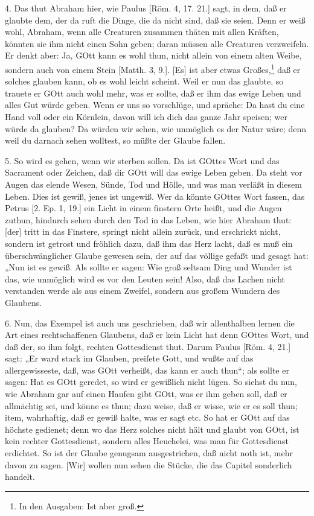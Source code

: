 4. Das thut Abraham hier, wie Paulus [Röm. 4, 17. 21.] sagt, in dem, daß er glaubte dem, der da ruft die Dinge, die da nicht sind, daß sie seien. Denn er weiß wohl, Abraham, wenn alle Creaturen zusammen thäten mit allen Kräften, könnten sie ihm nicht einen Sohn geben; daran müssen alle Creaturen verzweifeln. Er denkt aber: Ja, GOtt kann es wohl thun, nicht allein von einem alten Weibe, sondern auch von einem Stein [Matth. 3, 9.]. [Es] ist aber etwas Großes,\footnote{In den Ausgaben: Ist aber groß.} daß er solches glauben kann, ob es wohl leicht scheint. Weil er nun das glaubte, so trauete er GOtt auch wohl mehr, was er sollte, daß er ihm das ewige Leben und alles Gut würde geben. Wenn er uns so vorschlüge, und spräche: Da hast du eine Hand voll oder ein Körnlein, davon will ich dich das ganze Jahr speisen; wer würde da glauben? Da würden wir sehen, wie unmöglich es der Natur wäre; denn weil du darnach sehen wolltest, so müßte der Glaube fallen.

5. So wird es gehen, wenn wir sterben sollen. Da ist GOttes Wort und das Sacrament oder Zeichen, daß dir GOtt will das ewige Leben geben. Da steht vor Augen das elende Wesen, Sünde, Tod und Hölle, und was man verläßt in diesem Leben. Dies ist gewiß, jenes ist ungewiß. Wer da könnte GOttes Wort fassen, das Petrus [2. Ep. 1, 19.] ein Licht in einem finstern Orte heißt, und die Augen zuthun, hindurch sehen durch den Tod in das Leben, wie hier Abraham thut: [der] tritt in das Finstere, springt nicht allein zurück, und erschrickt nicht, sondern ist getrost und fröhlich dazu, daß ihm das Herz lacht, daß es muß ein überschwänglicher Glaube gewesen sein, der auf das völlige gefaßt und gesagt hat: „Nun ist es gewiß. Als sollte er sagen: Wie groß seltsam Ding und Wunder ist das, wie unmöglich wird es vor den Leuten sein! Also, daß das Lachen nicht verstanden werde als aus einem Zweifel, sondern aus großem Wundern des Glaubens.

6. Nun, das Exempel ist auch uns geschrieben, daß wir allenthalben lernen die Art eines rechtschaffenen Glaubens, daß er kein Licht hat denn GOttes Wort, und daß der, so ihm folgt, rechten Gottesdienst thut. Darum Paulus [Röm. 4, 21.] sagt: „Er ward stark im Glauben, preiſete Gott, und wußte auf das allergewisseste, daß, was GOtt verheißt, das kann er auch thun“; als sollte er sagen: Hat es GOtt geredet, so wird er gewißlich nicht lügen. So siehst du nun, wie Abraham gar auf einen Haufen gibt GOtt, was er ihm geben soll, daß er allmächtig sei, und könne es thun; dazu weise, daß er wisse, wie er es soll thun; item, wahrhaftig, daß er gewiß halte, was er sagt etc. So hat er GOtt auf das höchste gedienet; denn wo das Herz solches nicht hält und glaubt von GOtt, ist kein rechter Gottesdienst, sondern alles Heuchelei, was man für Gottesdienst erdichtet. So ist der Glaube genugsam ausgestrichen, daß nicht noth ist, mehr davon zu sagen. [Wir] wollen nun sehen die Stücke, die das Capitel sonderlich handelt.

